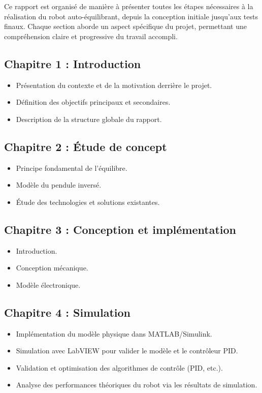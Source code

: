 \documentclass{report}
\begin{document}
Ce rapport est organisé de manière à présenter toutes les étapes nécessaires à la réalisation du robot auto-équilibrant, depuis la conception initiale jusqu’aux tests finaux. Chaque section aborde un aspect spécifique du projet, permettant une compréhension claire et progressive du travail accompli.

\subsection*{Chapitre 1 : Introduction}
\begin{itemize}
    \item Présentation du contexte et de la motivation derrière le projet.
    \item Définition des objectifs principaux et secondaires.
    \item Description de la structure globale du rapport.
\end{itemize}

\subsection*{Chapitre 2 : Étude de concept}
\begin{itemize}
    \item Principe fondamental de l'équilibre.
    \item Modèle du pendule inversé.
    \item Étude des technologies et solutions existantes.
\end{itemize}

\subsection*{Chapitre 3 : Conception et implémentation}
\begin{itemize}
    \item Introduction.
    \item Conception mécanique.
    \item Modèle électronique.
\end{itemize}

\subsection*{Chapitre 4 : Simulation}
\begin{itemize}
    \item Implémentation du modèle physique dans MATLAB/Simulink.
    \item Simulation avec LabVIEW pour valider le modèle et le contrôleur PID.
    \item Validation et optimisation des algorithmes de contrôle (PID, etc.).
    \item Analyse des performances théoriques du robot via les résultats de simulation.
\end{itemize}
\end{document}
